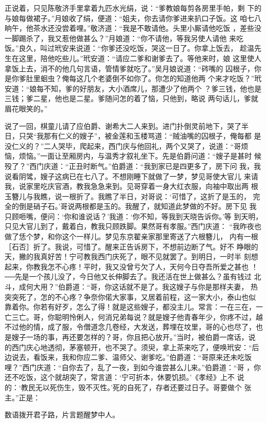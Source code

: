 正说着，只见陈敬济手里拿着九匹水光绢，说：“爹教娘每剪各房里手帕，剩
下的与娘每做裙子。”月娘收了绢，便道：“姐夫，你去请你爹进来扒口子饭。这
咱七八晌午，他茶水还没尝着哩。”敬济道：“我是不敢请他。头里小厮请他吃饭
，差些没一脚踢杀了，我又惹他做甚么？”月娘道：“你不请他，等我另使人请他
来吃饭。”良久，叫过玳安来说道：“你爹还没吃饭，哭这一日了。你拿上饭去，
趁温先生在这里，陪他吃些儿。”玳安道：“请应二爹和谢爹去了。等他来时，娘
这里使人拿饭上去，消不的他几句言语，管情爹就吃了。”吴月娘说道：“硶嘴的
囚根子，你是你爹肚里蛔虫？俺每这几个老婆倒不如你了。你怎的知道他两
个来才吃饭？”玳安道：“娘每不知，爹的好朋友，大小酒席儿，那遭少了他两个
？爹三钱，他也是三钱；爹二星，他也是二星。爹随问怎的着了恼，只他到，略说
两句话儿，爹就眉花眼笑的。”

说了一回，棋童儿请了应伯爵、谢希大二人来到。进门扑倒灵前地下，哭了半
日，只哭“我那有仁义的嫂子”，被金莲和玉楼骂道：“贼油嘴的囚根子，俺每都
是没仁义的？”二人哭毕，爬起来，西门庆与他回礼，两个又哭了，说道：“哥烦
恼，烦恼。”一面让至厢房内，与温秀才叙礼坐下。先是伯爵问道：“嫂子是甚时
候殁了？”西门庆道：“正丑时断气。”伯爵道：“我到家已是四更多了，房下问
我，我说看阴骘，嫂子这病已在七八了。不想刚睡下就做了一梦，梦见哥使大官儿
来请我，说家里吃庆官酒，教我急急来到。见哥穿着一身大红衣服，向袖中取出两
根玉簪儿与我瞧，说一根折了。我瞧了半日，对哥说：‘可惜了，这折了是玉的，
完全的倒是硝子石。’哥说两根都是玉的。我醒了，就知道此梦做的不好。房下见
我只顾咂嘴，便问：‘你和谁说话？’我道：‘你不知，等我到天晓告诉你。’等
到天明，只见大官儿到了，戴着白，教我只顾跌脚。果然哥有孝服。”西门庆道：
“我昨夜也做了恁个梦，和你这个一样儿。梦见东京翟亲家那里寄送了六根簪儿，
内有一根［石否］折了。我说，可惜了。醒来正告诉房下，不想前边断了气。好不
睁眼的天，撇的我真好苦！宁可教我西门庆死了，眼不见就罢了。到明日，一时半
刻想起来，你教我怎不心疼！平时，我又没曾亏欠了人，天何今日夺吾所爱之甚也
！──先是一个孩儿没了，今日他又长伸脚去了。我还活在世上做甚么？虽有钱过
北斗，成何大用？”伯爵道：“哥，你这话就不是了。我这嫂子与你是那样夫妻，
热突突死了，怎的不心疼？争奈你偌大家事，又居着前程，这一家大小，泰山也似
靠着你。你若有好歹，怎么了得！就是这些嫂子，都没主儿。常言：一在三在，一
亡三亡。哥，你聪明怜俐人，何消兄弟每说？就是嫂子他青春年少，你疼不过，越
不过他的情，成了服，令僧道念几卷经，大发送，葬埋在坟里，哥的心也尽了，也
是嫂子一场的事，再还要怎样的？哥，你且把心放开。”当时，被伯爵一席话，说
的西门庆心地透彻，茅塞顿开，也不哭了。须臾，拿上茶来吃了，便唤玳安：“后
边说去，看饭来，我和你应二爹、温师父、谢爹吃。”伯爵道：“哥原来还未吃饭
哩？”西门庆道：“自你去了，乱了一夜，到如今谁尝甚么儿来。”伯爵道：“哥
，你还不吃饭，这个就胡突了，常言道：‘宁可折本，休要饥损。’《孝经》上不
说的：‘教民无以死伤生，毁不灭性。’死的自死了，存者还要过日子。哥要做个
张主。”正是：

数语拨开君子路，片言题醒梦中人。